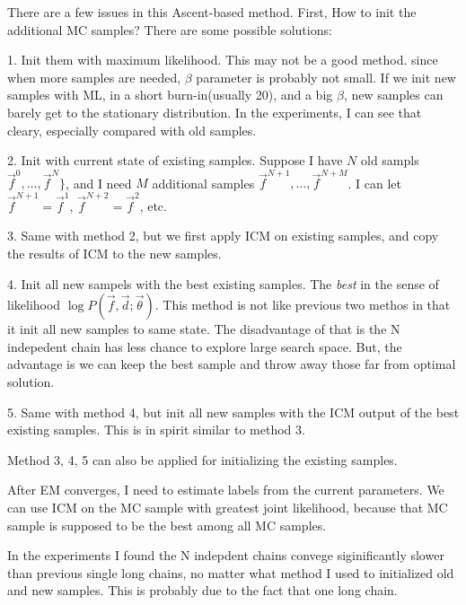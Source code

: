 \documentclass{article}
\begin{document}
There are a few issues in this Ascent-based method. First, How to init the additional MC samples? There are some possible solutions:
\begin{itemize*}
\item[1.] Init them with maximum likelihood. This may not be a good method. since when more samples are needed, $\beta$ parameter is probably not small. If we init new samples with ML, in a short burn-in(usually 20), and a big $\beta$, new samples can barely get to the stationary distribution. In the experiments, I can see that cleary, especially compared with old samples.

\item[2. ] Init with current state of existing samples. Suppose I have $N$ old sampls $\vec f^0, \dots, \vec f^N\}$, and I need $M$ additional samples $\vec f^{N+1}, \dots, \vec f^{N+M}$. I can let $\vec f^{N+1} = \vec f^{1}$, $\vec f^{N+2} = \vec f^{2}$, etc.

\item[3. ] Same with method 2, but we first apply ICM on existing samples, and copy the results of ICM to the new samples.

\item[4. ]Init all new sampels with the best existing samples. The \emph{best} in the sense of likelihood $\log P(\vec f, \vec d; \vec \theta)$. This method is not like previous two methos in that it init all new samples to same state. The disadvantage of that is the N indepedent chain has less chance to explore large search space. But, the advantage is we can keep the best sample and throw away those far from optimal solution.

\item[5. ] Same with method 4, but init all new samples with the ICM output of the best existing samples. This is in spirit similar to method 3.
\end{itemize*}

Method 3, 4, 5 can also be applied for initializing the existing samples.

After EM converges, I need to estimate labels from the current parameters. We can use ICM on the MC sample with greatest joint likelihood, because that MC sample is supposed to be the best among all MC samples.

In the experiments I found the N indepdent chains convege siginificantly slower than previous single long chains, no matter what method I used to initialized old and new samples. This is probably due to the fact that one long chain.
\end{document}
